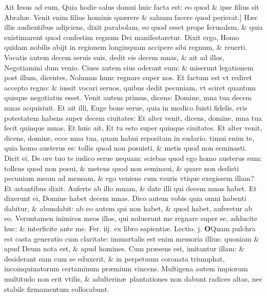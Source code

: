\documentclass[a5paper,10pt]{book}
\def\leftmarginnote{%
	\lrmarginnote{\hskip -\marginparsep \hskip -6.5em}}
\def\rightmarginnote{%
	\lrmarginnote{\hskip\columnwidth \hskip -1em}}
\def\ae{æ}
\begin{document}
\begin{multicols*}{2}
Ait
Iesus ad eum, Quia hodie salus domui huic facta est: eo quod \& ipse filius sit Abrah\ae . Venit enim filius hominis qu\ae rere \& saluum facere quod perierat.]
H\ae c\rightmarginnote{B} illis audientibus adijciens, dixit parabolam, eo quod esset prope Ierusalem, \& quia existimarent quod confestim regnum Dei manifestaretur.
Dixit ergo, Homo quidam nobilis abijt in regionem longinquam accipere sibi regnum, \& reuerti.
Vocatis autem decem seruis suis, dedit eis decem mnas, \& ait ad illos, Negotiamini dum venio. Ciues autem eius oderant eum: \& miserunt legationem post illum, dicentes, Nolumus hunc regnare super nos.
Et factum est vt rediret accepto regno: \& iussit vocari seruos, quibus dedit pecuniam, vt sciret quantum quisque negotiatus esset.
Venit autem primus, dicens: Domine, mna tua decem mnas acquisiuit. Et ait illi, Euge bone serue, quia in modico fuisti fidelis, eris potestatem habens super decem ciuitates: Et alter venit, dicens, domine, mna tua fecit quinque mnas.
Et huic ait, Et tu esto super quinque ciuitates. Et alter venit, dicens, domine, ecce mna tua, quam habui repositam in sudario, timui enim te, quia homo austerus es: tollis quod non posuisti, \& metis quod non seminasti.
Dicit ei, De ore tuo te iudico serue nequam: sciebas quod ego homo austerus sum: tollens quod non posui, \& metens quod non seminaui, \& quare non dedisti pecuniam meam ad mensam, \& ego veniens cum vsuris vtique exegissem illam?
Et astantibus dixit. Auferte ab illo mnam, \& date illi qui decem mnas habet. Et dixerunt ei, Domine habet decem mnas.
Dico autem vobis quia omni habenti dabitur, \& abundabit: ab eo autem qui non habet, \& quod habet, auferetur ab eo.
Veruntamen inimicos meos illos, qui noluerunt me regnare super se, adducite huc: \& interficite ante me.
\newline {} \color{red} \hypertarget{TUE-TERTIA-POST-ADV}{Fer. iij.} ex libro sapienti\ae . Lectio. j. \color{black}
\vspace{-2.25em}
\lettrine[lines=2]{\bfseries O}{}Quam\leftmarginnote{\begin{flushright}ca. 4.\end{flushright}} pulchra est casta generatio cum claritate: immortalis est enim memoria illius: quoniam \& apud Deum nota est, \& apud homines.
Cum pr\ae sens est, imitantur illam: \& desiderant eam cum se eduxerit, \& in perpetuum coronata triumphat, incoinquinatorum certaminum pr\ae mium vincens.
Multigena autem impiorum multitudo non erit vtilis, \& adulterin\ae \ plantationes non dabunt radices altas, nec stabile firmamentum collocabunt.

\end{multicols*}
\end{document}

